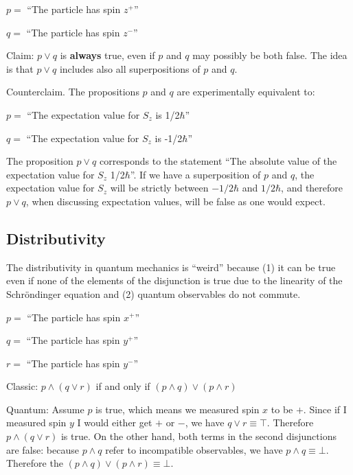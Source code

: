 \documentclass[11pt, executivepaper]{article}
\begin{document}
\begin{description}
	\item $p =$ ``The particle has spin $z^+$''
	\item $q =$ ``The particle has spin $z^-$''
\end{description}

Claim: $p \vee q$ is \textbf{always} true, even if $p$ and $q$ may possibly be both false. The idea is that $p \vee q$ includes also all superpositions of $p$ and $q$.

Counterclaim. The propositions $p$ and $q$ are experimentally equivalent to:
\begin{description}
	\item $p =$ ``The expectation value for $S_z$ is 1/2$\hbar$''
	\item $q =$ ``The expectation value for $S_z$ is -1/2$\hbar$''
\end{description}
The proposition $p \vee q$ corresponds to the statement ``The absolute value of the expectation value for $S_z$ 1/2$\hbar$''. If we have a superposition of $p$ and $q$, the expectation value for $S_z$ will be strictly between $-1/2 \hbar$ and $1/2 \hbar$, and therefore $p \vee q$, when discussing expectation values, will be false as one would expect.

\subsection{Distributivity}

The distributivity in quantum mechanics is ``weird'' because (1) it can be true even if none of the elements of the disjunction is true due to the linearity of the Schr\"ondinger equation and (2) quantum observables do not commute. 

\begin{description}
    \item $p =$ ``The particle has spin $x^+$''
    \item $q =$ ``The particle has spin $y^+$''
    \item $r =$ ``The particle has spin $y^-$''
\end{description}

Classic: $p \wedge (q \vee r)$ if and only if $(p \wedge  q) \vee (p \wedge r)$

Quantum: Assume $p$ is true, which means we measured spin $x$ to be $+$. Since if I measured spin $y$ I would either get $+$ or $-$, we have $q \vee r \equiv \top$. Therefore $p \wedge (q \vee r)$ is true. On the other hand, both terms in the second disjunctions are false: because $p \wedge  q$ refer to incompatible observables, we have $p \wedge  q \equiv \bot$. Therefore the $(p \wedge  q) \vee (p \wedge r) \equiv \bot$.
\end{document}
